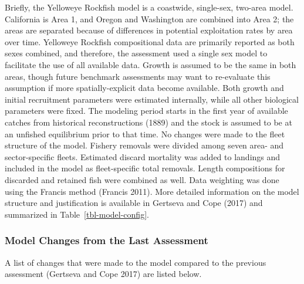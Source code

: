 \documentclass[
]{scrartcl}
\begin{document}
Briefly, the Yelloweye Rockfish model is a coastwide, single-sex,
two-area model. California is Area 1, and Oregon and Washington are
combined into Area 2; the areas are separated because of differences in
potential exploitation rates by area over time. Yelloweye Rockfish
compositional data are primarily reported as both sexes combined, and
therefore, the assessment used a single sex model to facilitate the use
of all available data. Growth is assumed to be the same in both areas,
though future benchmark assessments may want to re-evaluate this
assumption if more spatially-explicit data become available. Both growth
and initial recruitment parameters were estimated internally, while all
other biological parameters were fixed. The modeling period starts in
the first year of available catches from historical reconstructions
(1889) and the stock is assumed to be at an unfished equilibrium prior
to that time. No changes were made to the fleet structure of the model.
Fishery removals were divided among seven area- and sector-specific
fleets. Estimated discard mortality was added to landings and included
in the model as fleet-specific total removals. Length compositions for
discarded and retained fish were combined as well. Data weighting was
done using the Francis method (Francis 2011). More detailed information
on the model structure and justification is available in Gertseva and
Cope (2017) and summarized in Table~\ref{tbl-model-config}.

\subsubsection{Model Changes from the Last
Assessment}\label{sec-changes}

A list of changes that were made to the model compared to the previous
assessment (Gertseva and Cope 2017) are listed below.
\end{document}
